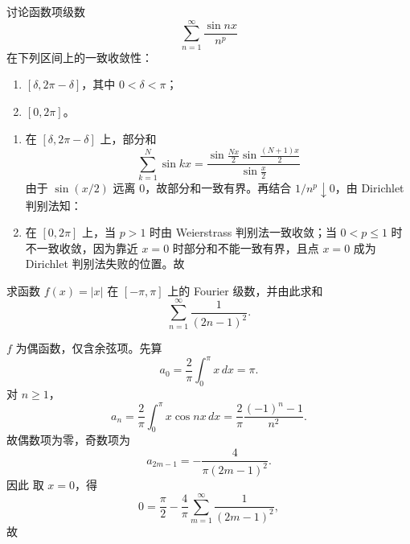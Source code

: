 \begin{question}
讨论函数项级数
\[
\sum_{n=1}^{\infty}\frac{\sin nx}{n^p}
\]
在下列区间上的一致收敛性：
\begin{enumerate}[label=(\arabic*),leftmargin=2.8em,itemsep=0.2em]
\item $[\delta,2\pi-\delta]$，其中 $0<\delta<\pi$；
\item $[0,2\pi]$。
\end{enumerate}
\begin{solution}

\begin{enumerate}[label=(\arabic*),leftmargin=2.8em,itemsep=0.2em]
\item 在 $[\delta,2\pi-\delta]$ 上，部分和
\[
\sum_{k=1}^{N}\sin kx=\frac{\sin\frac{Nx}{2}\sin\frac{(N+1)x}{2}}{\sin\frac{x}{2}}
\]
由于 $\sin(x/2)$ 远离 $0$，故部分和一致有界。再结合 $1/n^p\downarrow0$，由 Dirichlet 判别法知：
\item 在 $[0,2\pi]$ 上，当 $p>1$ 时由 Weierstrass 判别法一致收敛；当 $0<p\le1$ 时不一致收敛，因为靠近 $x=0$ 时部分和不能一致有界，且点 $x=0$ 成为 Dirichlet 判别法失败的位置。故
\end{enumerate}
\end{solution}
\end{question}

\begin{question}
求函数 $f(x)=|x|$ 在 $[-\pi,\pi]$ 上的 Fourier 级数，并由此求和
\[
\sum_{n=1}^{\infty}\frac{1}{(2n-1)^2}.
\]

\begin{solution}

$f$ 为偶函数，仅含余弦项。先算
\[
a_0=\frac{2}{\pi}\int_0^{\pi}x\,dx=\pi.
\]
对 $n\ge1$，
\[
a_n=\frac{2}{\pi}\int_0^{\pi}x\cos nx\,dx
=\frac{2}{\pi}\frac{(-1)^n-1}{n^2}.
\]
故偶数项为零，奇数项为
\[
a_{2m-1}=-\frac{4}{\pi(2m-1)^2}.
\]
因此
取 $x=0$，得
\[
0=\frac{\pi}{2}-\frac{4}{\pi}\sum_{m=1}^{\infty}\frac{1}{(2m-1)^2},
\]
故
\end{solution}
\end{question}

